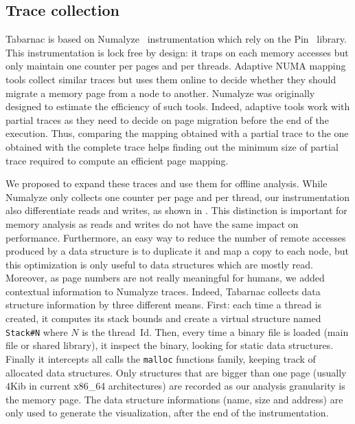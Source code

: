 \subsection{Trace collection}

\gls{Tabarnac} is based on \gls{Numalyze}~\cite{Diener15Characterizing} instrumentation which rely on the \gls{Pin}~\cite{Luk05Pin} library.
This instrumentation is lock free by design: it traps on each memory accesses but only maintain one counter per pages and per threads.
Adaptive \gls{NUMA} mapping tools collect similar traces but uses them online to decide whether they should migrate a memory page from a node to another.
\gls{Numalyze} was originally designed to estimate the efficiency of such tools.
Indeed, adaptive tools work with partial traces as they need to decide on page migration before the end of the execution.
Thus, comparing the mapping obtained with a partial trace to the one obtained with the complete trace helps finding out the minimum size of partial trace required to compute an efficient page mapping.

We proposed to expand these traces and use them for offline analysis.
While \gls{Numalyze} only collects one counter per page and per thread, our instrumentation also differentiate reads and writes, as shown in .
This distinction is important for memory analysis as reads and writes do not have the same impact on performance.
Furthermore, an easy way to reduce the number of remote accesses produced by a data structure is to duplicate it and map a copy to each node, but this optimization is only useful to data structures which are mostly read.
Moreover, as page numbers are not really meaningful for humans, we added contextual information to \gls{Numalyze} traces.
Indeed, \gls{Tabarnac} collects data structure information by three different means.
First: each time a thread is created, it computes its stack bounds and create a virtual structure named \texttt{Stack\#N} where $N$ is the thread~Id.
Then, every time a binary file is loaded (main file or shared library), it inspect the binary, looking for static data structures.
Finally it intercepts all calls the \texttt{malloc} functions family, keeping track of allocated data structures.
Only structures that are bigger than one page (usually $4$Kib in current x86\_64 architectures) are recorded as our analysis granularity is the memory page.
The data structure informations (name, size and address) are only used to generate the visualization, after the end of the instrumentation.

